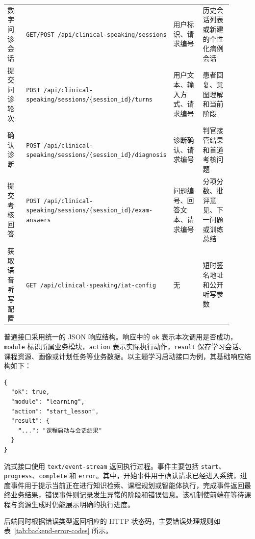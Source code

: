 {\begin{longtable}{
  p{0.14\linewidth}
  p{0.31\linewidth}
  p{0.23\linewidth}
  p{0.23\linewidth}
}
  数字问诊会话
  & \texttt{GET/POST /api/clinical-speaking/sessions}
  & 用户标识、请求编号
  & 历史会话列表或新建的个性化病例会话 \\

  提交问诊轮次
  & \texttt{POST /api/clinical-speaking/sessions/\{session\_id\}/turns}
  & 用户文本、输入方式、请求编号
  & 患者回复、意图理解和当前阶段 \\

  确认诊断
  & \texttt{POST /api/clinical-speaking/sessions/\{session\_id\}/diagnosis}
  & 诊断确认、请求编号
  & 判官接管结果和首道考核问题 \\

  提交考核回答
  & \texttt{POST /api/clinical-speaking/sessions/\{session\_id\}/exam-answers}
  & 问题编号、回答文本、请求编号
  & 分项分数、批评意见、下一问题或训练总结 \\

  获取语音听写配置
  & \texttt{GET /api/clinical-speaking/iat-config}
  & 无
  & 短时签名地址和公开听写参数 \\
  \end{longtable}
}

普通接口采用统一的 JSON 响应结构。响应中的 \texttt{ok} 表示本次调用是否成功，\texttt{module} 标识所属业务模块，\texttt{action} 表示实际执行动作，\texttt{result} 保存学习会话、课程资源、画像或计划任务等业务数据。以主题学习启动接口为例，其基础响应结构如下：

\begin{lstlisting}
{
  "ok": true,
  "module": "learning",
  "action": "start_lesson",
  "result": {
    "...": "课程启动与会话结果"
  }
}
\end{lstlisting}

流式接口使用 \texttt{text/event-stream} 返回执行过程。事件主要包括 \texttt{start}、\texttt{progress}、\texttt{complete} 和 \texttt{error}。其中，开始事件用于确认请求已经进入系统，进度事件用于提示当前正在进行知识检索、课程规划或智能体执行，完成事件返回最终业务结果，错误事件则记录发生异常的阶段和错误信息。该机制使前端在等待课程与资源生成时仍能展示明确的执行进度。

后端同时根据错误类型返回相应的 HTTP 状态码，主要错误处理规则如表~\ref{tab:backend-error-codes} 所示。

